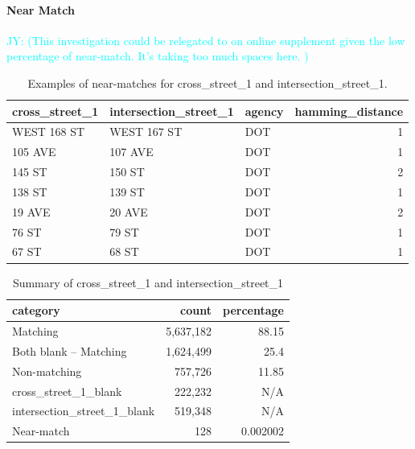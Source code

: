\documentclass[linenumber]{jdsart}
\newcommand{\jy}[1]{\textcolor{cyan}{JY: (#1)}}
\begin{document}
\paragraph{Near Match}

\jy{This investigation could be relegated to on online supplement
  given the low percentage of near-match. It's taking too much spaces
  here.
}

\begin{table}[tbp]
    \centering
     \caption{Examples of near-matches for cross\_street\_1 and intersection\_street\_1.}
     \label{tab:x1nearmatches}
		\begin{tabular}{l l l r}
	        \toprule
	        \textbf{cross\_street\_1} & \textbf{intersection\_street\_1} 
	        & \textbf{agency} & \textbf{hamming\_distance} \\
	        \midrule
	        WEST 168 ST    & WEST 167 ST           & DOT    & 1 \\
	        105 AVE        & 107 AVE               & DOT    & 1 \\
	        145 ST         & 150 ST                & DOT    & 2 \\
	        138 ST         & 139 ST                & DOT    & 1 \\
	        19 AVE         & 20 AVE                & DOT    & 2 \\
	        76 ST          & 79 ST                 & DOT    & 1 \\
	        67 ST          & 68 ST                 & DOT    & 1 \\
	        \bottomrule
	    \end{tabular}
\end{table}

\begin{table}[tbp]
    \centering
    \caption{Summary of cross\_street\_1 and intersection\_street\_1}
    \label{tab:summary1}
	    \begin{tabular}{l r r}
	        \toprule
	        \textbf{category} & \textbf{count} & \textbf{percentage} \\
	        \midrule
	        Matching                    & 5,637,182 & 88.15     \\
	        Both blank -- Matching      & 1,624,499 & 25.4      \\
	        Non-matching                &   757,726 & 11.85     \\
	        cross\_street\_1\_blank     &   222,232 & N/A       \\
	        intersection\_street\_1\_blank &   519,348 & N/A       \\
	        Near-match                  &       128 & 0.002002  \\
	        \bottomrule
	    \end{tabular}
\end{table}
\end{document}
